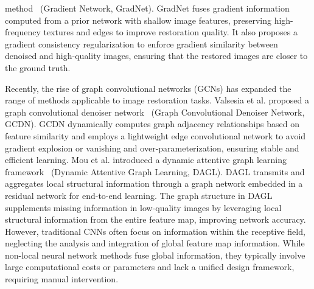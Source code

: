 method~\cite{liu2020gradnet} (Gradient Network, GradNet). GradNet fuses gradient information computed from a prior network with shallow image features, preserving high-frequency textures and edges to improve restoration quality. It also proposes a gradient consistency regularization to enforce gradient similarity between denoised and high-quality images, ensuring that the restored images are closer to the ground truth.

Recently, the rise of graph convolutional networks (GCNs) has expanded the range of methods applicable to image restoration tasks. Valsesia et al. proposed a graph convolutional denoiser network~\cite{valsesia2020deep} (Graph Convolutional Denoiser Network, GCDN). GCDN dynamically computes graph adjacency relationships based on feature similarity and employs a lightweight edge convolutional network to avoid gradient explosion or vanishing and over-parameterization, ensuring stable and efficient learning. Mou et al. introduced a dynamic attentive graph learning framework~\cite{mou2021dynamic} (Dynamic Attentive Graph Learning, DAGL). DAGL transmits and aggregates local structural information through a graph network embedded in a residual network for end-to-end learning. The graph structure in DAGL supplements missing information in low-quality images by leveraging local structural information from the entire feature map, improving network accuracy. However, traditional CNNs often focus on information within the receptive field, neglecting the analysis and integration of global feature map information. While non-local neural network methods fuse global information, they typically involve large computational costs or parameters and lack a unified design framework, requiring manual intervention.